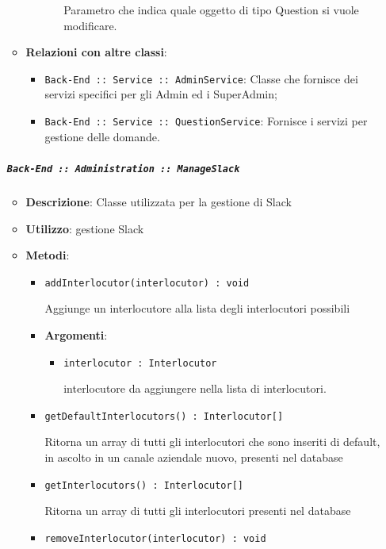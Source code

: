 \documentclass[../DefinizioneDiProdotto.tex]{subfiles}
\begin{document}
\begin{itemize}
\begin{itemize}
\begin{itemize}
\begin{itemize}
	 Parametro che indica quale oggetto di tipo Question si vuole modificare.
	\end{itemize}
	\end{itemize}\vspace{0.5em}
	\item \textbf{Relazioni con altre classi}:
	\begin{itemize}
	\item \texttt{Back-End :: Service :: AdminService}: Classe che fornisce dei servizi specifici per gli Admin ed i SuperAdmin;
	\item \texttt{Back-End :: Service :: QuestionService}: Fornisce i servizi per gestione delle domande.
	\end{itemize}
	\end{itemize}\subparagraph{\texttt{Back-End :: Administration :: ManageSlack}}
	\begin{itemize}\item \textbf{Descrizione}: Classe utilizzata per la gestione di Slack
	\item \textbf{Utilizzo}: gestione Slack
	\item \textbf{Metodi}:
	\begin{itemize}
	\item \texttt{addInterlocutor(interlocutor) : void}\

	 Aggiunge un interlocutore alla lista degli interlocutori possibili

	\item \textbf{Argomenti}:
	\begin{itemize}
	\item \texttt{interlocutor : Interlocutor}\

	 interlocutore da aggiungere nella lista di interlocutori.
	\end{itemize}
	\end{itemize}\vspace{0.5em}
	\begin{itemize}
	\item \texttt{getDefaultInterlocutors() : Interlocutor[]}\

	 Ritorna un array di tutti gli interlocutori che sono inseriti di default, in ascolto in un canale aziendale nuovo, presenti nel database
	\end{itemize}\vspace{0.5em}
	\begin{itemize}
	\item \texttt{getInterlocutors() : Interlocutor[]}\

	 Ritorna un array di tutti gli interlocutori presenti nel database
	\end{itemize}\vspace{0.5em}
	\begin{itemize}
	\item \texttt{removeInterlocutor(interlocutor) : void}\


\end{itemize}
\end{itemize}
\end{itemize}
\end{document}
